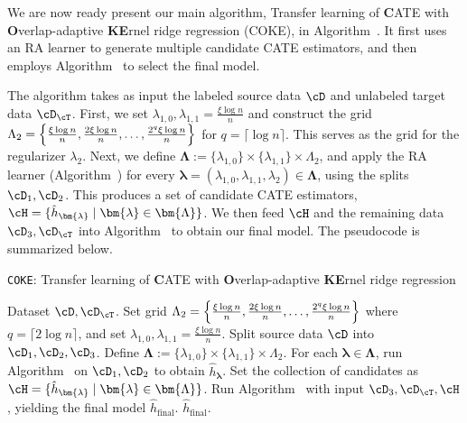 \documentclass[12pt,a4paper,pdftex,onepage]{article}
\newcommand{\final}{\operatorname{final}}
\begin{document}
We are now ready present our main algorithm, Transfer learning of {\bf C}ATE with {\bf O}verlap-adaptive {\bf KE}rnel ridge regression (COKE), in Algorithm~. It first uses an RA learner to generate multiple candidate CATE estimators, and then employs Algorithm~ to select the final model.

The algorithm takes as input the labeled source data \(\cD\) and unlabeled target data \(\cD_\cT\).  
First, we set \(\lambda_{1,0}, \lambda_{1,1} = \frac{\xi\log n}{n}\) and construct the grid \(\Lambda_2 =\Bigl\{ \frac{\xi \log n}{n}, \frac{2 \xi 
\log n }{n}, \dots, \frac{2^q  \xi \log n}{n} \Bigr\}\) for \(q = \lceil \log n \rceil\).  
This serves as the grid for the regularizer \(\lambda_2\).  
Next, we define \(\bm{\Lambda} := \{ \lambda_{1,0}\} \times \{\lambda_{1,1}\} \times \Lambda_2\), and apply the RA learner (Algorithm~) for every \(\bm{\lambda} = (\lambda_{1,0}, \lambda_{1,1}, \lambda_2) \in \bm{\Lambda}\), using the splits \(\cD_1, \cD_2\).  
This produces a set of candidate CATE estimators, \(\cH = \{\hat{h}_{\bm{\lambda}} \mid \bm{\lambda} \in \bm{\Lambda}\}\).  
We then feed \(\cH\) and the remaining data \(\cD_3, \cD_\cT\) into Algorithm~ to obtain our final model.  
The pseudocode is summarized below.

\begin{algorithm}[H]
\caption{\texttt{COKE}: Transfer learning of {\bf C}ATE with {\bf O}verlap-adaptive {\bf KE}rnel ridge regression}
\label{algorithm; main}
\begin{algorithmic}
\Require Dataset $\cD, \cD_{\cT}$.
\State Set grid \(\Lambda_2 = \Bigl\{ \frac{\xi \log n}{n}, \frac{2 \xi \log n}{n}, \dots, \frac{2^q \xi \log n}{n} \Bigr\}\) where $q = \lceil 2\log n \rceil$, and set $\lambda_{1,0}, \lambda_{1,1} = \frac{\xi\log n}{n}$.
\State Split source data $\cD$ into $\cD_{1}, \cD_{2}, \cD_{3}$.
\State Define \(\bm{\Lambda} := \{ \lambda_{1,0}\} \times \{\lambda_{1,1}\} \times \Lambda_2\). For each \( \bm{\lambda} \in \bm{\Lambda}\), run Algorithm~ on \(\cD_1, \cD_2\) to obtain $\hat{h}_{\bm{\lambda}}$.
\State Set the collection of candidates as $\cH = \{\hat{h}_{\bm{\lambda}} \mid \bm{\lambda} \in \bm{\Lambda}\}$.
\State Run Algorithm~ with input \(\cD_3, \cD_\cT, \cH\), yielding the final model \(\hat{h}_{\final}\).
\Ensure $\hat{h}_{\final}$.
\end{algorithmic}
\end{algorithm}
\end{document}
